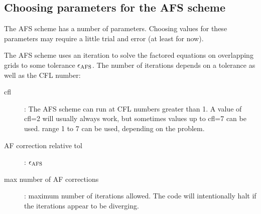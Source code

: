 \subsection{Choosing parameters for the AFS scheme} \label{sec:AFSparameters}


The AFS scheme has a number of parameters. Choosing 
values for these parameters may require a little trial and error (at least for now).

The AFS scheme uses an iteration to solve the factored equations on overlapping grids
to some tolerance $\epsilon_{\rm AFS}$. 
The number of iterations depends on a tolerance as well as the CFL number:
\begin{description}
  \item[\quad cfl] : The AFS scheme can run at CFL numbers greater than 1. A value of 
      cfl=2 will usually always work, but sometimes values up to cfl=7 can be used.
      range 1 to 7 can be used, depending on the problem. 
  \item[\quad AF correction relative tol] : $\epsilon_{\rm AFS}$
  \item[\quad max number of AF corrections] : maximum number of iterations allowed. The code
     will intentionally halt if the iterations appear to be diverging.
\end{description}
